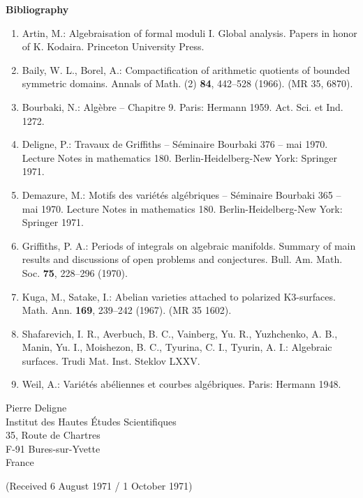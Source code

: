 \documentclass[10pt]{article}
\begin{document}
\begin{center}
\bfseries Bibliography
\end{center}
\begin{enumerate}[label=\arabic*.]
\item Artin, M.: Algebraisation of formal moduli I. Global analysis. Papers in honor of K. Kodaira. Princeton University Press.
\item Baily, W. L., Borel, A.: Compactification of arithmetic quotients of bounded symmetric domains. Annals of Math. (2) \textbf{84}, 442--528 (1966). (MR 35, 6870).
\item Bourbaki, N.: Algèbre -- Chapitre 9. Paris: Hermann 1959. Act. Sci. et Ind. 1272.
\item Deligne, P.: Travaux de Griffiths -- Séminaire Bourbaki 376 -- mai 1970. Lecture Notes in mathematics 180. Berlin-Heidelberg-New York: Springer 1971.
\item Demazure, M.: Motifs des variétés algébriques -- Séminaire Bourbaki 365 -- mai 1970. Lecture Notes in mathematics 180. Berlin-Heidelberg-New York: Springer 1971.
\item Griffiths, P. A.: Periods of integrals on algebraic manifolds. Summary of main results and discussions of open problems and conjectures. Bull. Am. Math. Soc. \textbf{75}, 228--296 (1970).
\item Kuga, M., Satake, I.: Abelian varieties attached to polarized K3-surfaces. Math. Ann. \textbf{169}, 239--242 (1967). (MR 35 1602).
\item Shafarevich, I. R., Averbuch, B. C., Vainberg, Yu. R., Yuzhchenko, A. B., Manin, Yu. I., Moishezon, B. C., Tyurina, C. I., Tyurin, A. I.: Algebraic surfaces. Trudi Mat. Inst. Steklov LXXV.
\item Weil, A.: Variétés abéliennes et courbes algébriques. Paris: Hermann 1948.
\end{enumerate}

\begin{flushright}
Pierre Deligne\\
Institut des Hautes Études Scientifiques\\
35, Route de Chartres\\
F-91 Bures-sur-Yvette\\
France
\end{flushright}

\begin{center}
(Received 6 August 1971 / 1 October 1971)
\end{center}
\end{document}
